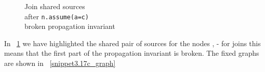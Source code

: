 \begin{figure}[H]

\caption{
Join shared sources\\
after \lstinline{n.assume(a=c)} \\
broken propagation invariant
}
\label{snippet3.17b_graph}
\end{figure}
In ~\ref{snippet3.17b_graph} we have highlighted the shared pair of sources for the nodes ,   - 
for joins this means that the first part of the propagation invariant is broken.
The fixed graphs are shown in ~\ref{snippet3.17c_graph}
